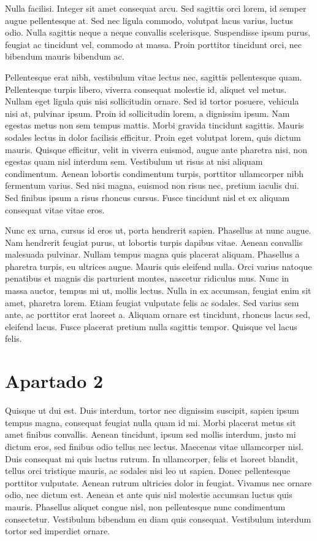 \documentclass[
]{interact}
\begin{document}
Nulla facilisi. Integer sit amet consequat arcu. Sed sagittis orci
lorem, id semper augue pellentesque at. Sed nec ligula commodo, volutpat
lacus varius, luctus odio. Nulla sagittis neque a neque convallis
scelerisque. Suspendisse ipsum purus, feugiat ac tincidunt vel, commodo
at massa. Proin porttitor tincidunt orci, nec bibendum mauris bibendum
ac.

Pellentesque erat nibh, vestibulum vitae lectus nec, sagittis
pellentesque quam. Pellentesque turpis libero, viverra consequat
molestie id, aliquet vel metus. Nullam eget ligula quis nisi
sollicitudin ornare. Sed id tortor posuere, vehicula nisi at, pulvinar
ipsum. Proin id sollicitudin lorem, a dignissim ipsum. Nam egestas metus
non sem tempus mattis. Morbi gravida tincidunt sagittis. Mauris sodales
lectus in dolor facilisis efficitur. Proin eget volutpat lorem, quis
dictum mauris. Quisque efficitur, velit in viverra euismod, augue ante
pharetra nisi, non egestas quam nisl interdum sem. Vestibulum ut risus
at nisi aliquam condimentum. Aenean lobortis condimentum turpis,
porttitor ullamcorper nibh fermentum varius. Sed nisi magna, euismod non
risus nec, pretium iaculis dui. Sed finibus ipsum a risus rhoncus
cursus. Fusce tincidunt nisl et ex aliquam consequat vitae vitae eros.

Nunc ex urna, cursus id eros ut, porta hendrerit sapien. Phasellus at
nunc augue. Nam hendrerit feugiat purus, ut lobortis turpis dapibus
vitae. Aenean convallis malesuada pulvinar. Nullam tempus magna quis
placerat aliquam. Phasellus a pharetra turpis, eu ultrices augue. Mauris
quis eleifend nulla. Orci varius natoque penatibus et magnis dis
parturient montes, nascetur ridiculus mus. Nunc in massa auctor, tempus
mi ut, mollis lectus. Nulla in ex accumsan, feugiat enim sit amet,
pharetra lorem. Etiam feugiat vulputate felis ac sodales. Sed varius sem
ante, ac porttitor erat laoreet a. Aliquam ornare est tincidunt, rhoncus
lacus sed, eleifend lacus. Fusce placerat pretium nulla sagittis tempor.
Quisque vel lacus felis.

\section{Apartado 2}\label{apartado-2}

Quisque ut dui est. Duis interdum, tortor nec dignissim suscipit, sapien
ipsum tempus magna, consequat feugiat nulla quam id mi. Morbi placerat
metus sit amet finibus convallis. Aenean tincidunt, ipsum sed mollis
interdum, justo mi dictum eros, sed finibus odio tellus nec lectus.
Maecenas vitae ullamcorper nisl. Duis consequat mi quis luctus rutrum.
In ullamcorper, felis et laoreet blandit, tellus orci tristique mauris,
ac sodales nisi leo ut sapien. Donec pellentesque porttitor vulputate.
Aenean rutrum ultricies dolor in feugiat. Vivamus nec ornare odio, nec
dictum est. Aenean et ante quis nisl molestie accumsan luctus quis
mauris. Phasellus aliquet congue nisl, non pellentesque nunc condimentum
consectetur. Vestibulum bibendum eu diam quis consequat. Vestibulum
interdum tortor sed imperdiet ornare.
\end{document}
